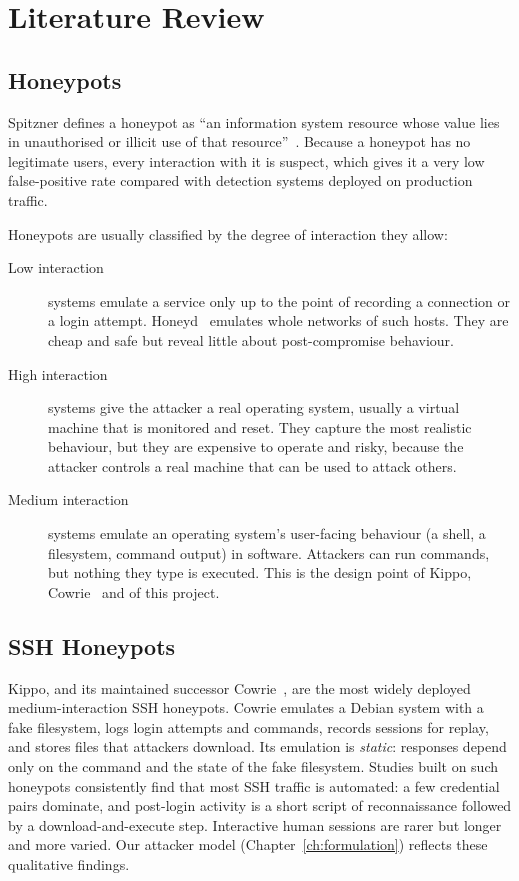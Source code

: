 \chapter{Literature Review}
\label{ch:lit}

\section{Honeypots}

Spitzner defines a honeypot as ``an information system resource whose value lies in
unauthorised or illicit use of that resource''~\cite{spitzner2002honeypots}. Because a honeypot
has no legitimate users, every interaction with it is suspect, which gives it a very low
false-positive rate compared with detection systems deployed on production traffic.

Honeypots are usually classified by the degree of interaction they allow:

\begin{description}
  \item[Low interaction] systems emulate a service only up to the point of recording a
    connection or a login attempt. Honeyd~\cite{provos2004honeyd} emulates whole networks of
    such hosts. They are cheap and safe but reveal little about post-compromise behaviour.
  \item[High interaction] systems give the attacker a real operating system, usually a
    virtual machine that is monitored and reset. They capture the most realistic behaviour, but
    they are expensive to operate and risky, because the attacker controls a real machine that
    can be used to attack others.
  \item[Medium interaction] systems emulate an operating system's user-facing behaviour (a
    shell, a filesystem, command output) in software. Attackers can run commands, but nothing
    they type is executed. This is the design point of Kippo, Cowrie~\cite{cowrie} and of this
    project.
\end{description}

\section{SSH Honeypots}

Kippo, and its maintained successor Cowrie~\cite{cowrie}, are the most widely deployed
medium-interaction SSH honeypots. Cowrie emulates a Debian system with a fake filesystem,
logs login attempts and commands, records sessions for replay, and stores files that attackers
download. Its emulation is \emph{static}: responses depend only on the command and the state of
the fake filesystem. Studies built on such honeypots consistently find that most SSH
traffic is automated: a few credential pairs dominate, and post-login activity is a short
script of reconnaissance followed by a download-and-execute step. Interactive human sessions
are rarer but longer and more varied. Our attacker model (Chapter~\ref{ch:formulation})
reflects these qualitative findings.

